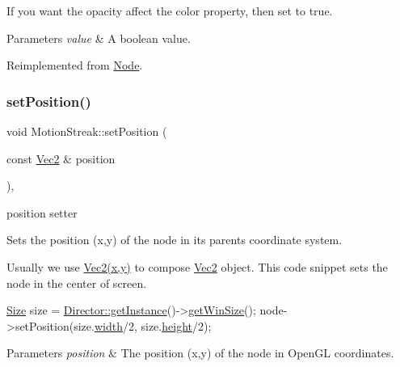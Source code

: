If you want the opacity affect the color property, then set to true. 
\begin{DoxyParams}{Parameters}
{\em value} & A boolean value. \\
\hline
\end{DoxyParams}


Reimplemented from \hyperlink{classNode_a978c5435ab23f76e9efdf0f7e9e288e5}{Node}.

\mbox{\label{classMotionStreak_a2d7df706b1ec462093363d18fd0baf58}} 
\subsubsection{\texorpdfstring{set\+Position()}{setPosition()}\hspace{0.1cm}{\footnotesize\ttfamily [1/4]}}
{\footnotesize\ttfamily void Motion\+Streak\+::set\+Position (\begin{DoxyParamCaption}\item[{const \hyperlink{classVec2}{Vec2} \&}]{position }\end{DoxyParamCaption})\hspace{0.3cm}{\ttfamily [override]}, {\ttfamily [virtual]}}



position setter 

Sets the position (x,y) of the node in its parent\textquotesingle{}s coordinate system.

Usually we use {\ttfamily \hyperlink{classVec2}{Vec2(x,y)}} to compose \hyperlink{classVec2}{Vec2} object. This code snippet sets the node in the center of screen. 
\begin{DoxyCode}
\hyperlink{classSize}{Size} size = \hyperlink{classDirector_a8d2a4ca9e20cd400ddadd516efa111e0}{Director::getInstance}()->\hyperlink{classDirector_af07668df4a8916e6eb0f79a93f6588fe}{getWinSize}();
node->setPosition(size.\hyperlink{classSize_af0be19024ddd79e7843492b3760c21f0}{width}/2, size.\hyperlink{classSize_a880fa21eaad5a5a0fe439d440776fd05}{height}/2);
\end{DoxyCode}



\begin{DoxyParams}{Parameters}
{\em position} & The position (x,y) of the node in Open\+GL coordinates. \\
\hline
\end{DoxyParams}


